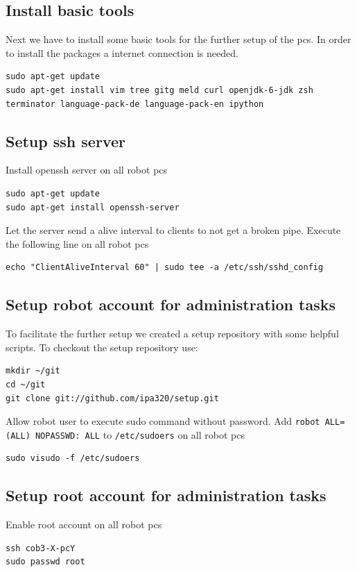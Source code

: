 \subsection{Install basic tools}
Next we have to install some basic tools for the further setup of the pcs. In order to install the packages a internet connection is needed.

\begin{lstlisting}
sudo apt-get update
sudo apt-get install vim tree gitg meld curl openjdk-6-jdk zsh terminator language-pack-de language-pack-en ipython 
\end{lstlisting}

\subsection{Setup ssh server}
Install openssh server on all robot pcs
\begin{lstlisting}
sudo apt-get update
sudo apt-get install openssh-server
\end{lstlisting}
Let the server send a alive interval to clients to not get a broken pipe. Execute the following line on all robot pcs
\begin{lstlisting}
echo "ClientAliveInterval 60" | sudo tee -a /etc/ssh/sshd_config
\end{lstlisting}

\subsection{Setup robot account for administration tasks}
To facilitate the further setup we created a setup repository with some helpful scripts. To checkout the setup repository use:

\begin{lstlisting}
mkdir ~/git
cd ~/git
git clone git://github.com/ipa320/setup.git
\end{lstlisting}


Allow robot user to execute sudo command without password. Add \texttt{robot ALL=(ALL) NOPASSWD: ALL} to \texttt{/etc/sudoers} on all robot pcs
\begin{lstlisting}
sudo visudo -f /etc/sudoers
\end{lstlisting}

\subsection{Setup root account for administration tasks} \label{sec:root_user}
Enable root account on all robot pcs
\begin{lstlisting}
ssh cob3-X-pcY
sudo passwd root
\end{lstlisting}

